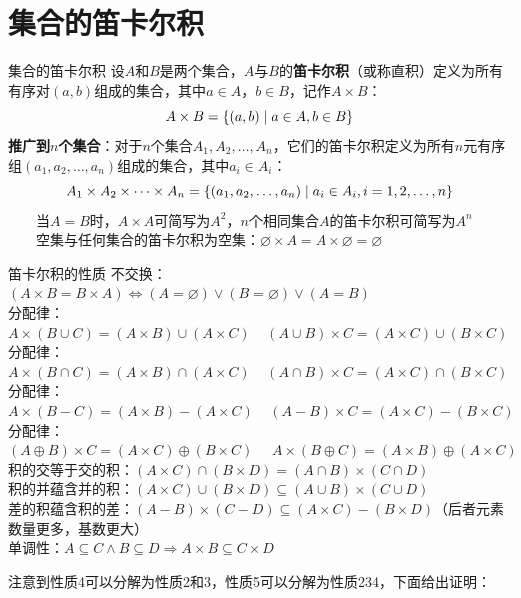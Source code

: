 \section{集合的笛卡尔积}
\begin{definition}{集合的笛卡尔积}{}
设$A$和$B$是两个集合，$A$与$B$的\textbf{笛卡尔积}（或称直积）定义为所有有序对$(a,b)$组成的集合，其中$a \in A$，$b \in B$，记作$A \times B$：\vspace{-10pt}
$$A \times B = \{(a,b) \mid a \in A, b \in B\}\vspace{-10pt}$$
\textbf{推广到$n$个集合}：对于$n$个集合$A_1, A_2, \ldots, A_n$，它们的笛卡尔积定义为所有$n$元有序组$(a_1, a_2, \ldots, a_n)$组成的集合，其中$a_i \in A_i$：
\vspace{-10pt}$$A_1 \times A_2 \times \cdots \times A_n = \{(a_1, a_2, \ldots, a_n) \mid a_i \in A_i, i = 1,2,\ldots,n\}\vspace{-10pt}$$
~~~~当$A = B$时，$A \times A$可简写为$A^2$，$n$个相同集合$A$的笛卡尔积可简写为$A^n$\\
~~~~空集与任何集合的笛卡尔积为空集：$\varnothing \times A = A \times \varnothing = \varnothing$
\end{definition}
\begin{theorem}{笛卡尔积的性质}{}
不交换：$(A\times B=B\times A)\Leftrightarrow (A=\varnothing)\lor(B=\varnothing)\lor(A=B)$\\
分配律：$A\times(B\cup C)=(A\times B)\cup(A\times C)~~~~~(A\cup B)\times C=(A\times C)\cup(B\times C)$\\
分配律：$A\times(B\cap C)=(A\times B)\cap(A\times C)~~~~~(A\cap B)\times C=(A\times C)\cap(B\times C)$\\
分配律：$A\times(B-C)=(A\times B)-(A\times C)~~~~~(A-B)\times C=(A\times C)-(B\times C)$\\
分配律：$(A\oplus B)\times C=(A\times C)\oplus(B\times C)~~~~~~A\times(B\oplus C)=(A\times B)\oplus(A\times C)$\\
积的交等于交的积：$(A\times C)\cap(B\times D)=(A\cap B)\times(C\cap D)$\\
积的并蕴含并的积：$(A\times C)\cup(B\times D)\subseteq(A\cup B)\times(C\cup D)$\\
差的积蕴含积的差：$(A-B)\times(C-D)\subseteq (A\times C)-(B\times D)$（后者元素数量更多，基数更大）\\
单调性：$A\subseteq C\land B\subseteq D\Rightarrow A\times B\subseteq C\times D$
\end{theorem}
注意到性质4可以分解为性质2和3，性质5可以分解为性质234，下面给出证明：\vspace{-10pt}
